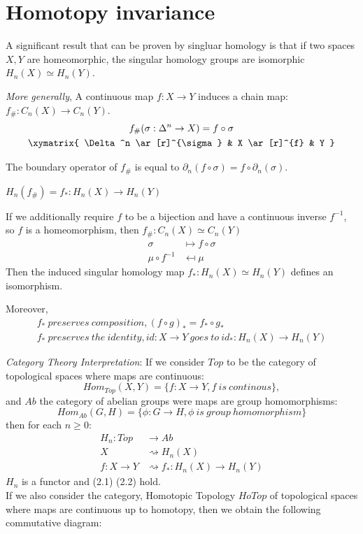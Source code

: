 \documentclass[11pt,a4paper]{report}
\begin{document}
    \section{Homotopy invariance}

    A significant result that can be proven by singluar homology is that if two spaces $X, Y$ are homeomorphic, the singular homology groups are isomorphic $ H_n(X) \simeq H_n(Y)$.

    \emph{More generally},
    A continuous map $f: X \rightarrow Y$ induces a chain map: $f_\#: C_n(X) \rightarrow C_n(Y)$.
    \begin{gather*}
        f_\#(\sigma: \Delta^ n \rightarrow X) = f \circ \sigma \\
                    \xymatrix{
                        \Delta^n  \ar[r]^{\sigma} &
                        X  \ar[r]^{f} & Y  }
    \end{gather*}

    The boundary operator of $f_\#$ is equal to $\partial_n(f \circ \sigma) = f \circ \partial_n(\sigma)$.

    $H_n(f_\#) = f_*: H_n(X) \rightarrow H_n(Y)$ \\

    \par
    If we additionally require $f$ to be a bijection and have a continuous inverse $f^{-1}$, so $f$ is a homeomorphism, then $f_\#: C_n(X) \simeq C_n(Y)$
    \begin{align*}
        \sigma &\mapsto f \circ \sigma \\
        \mu \circ f^{-1} &\mapsfrom \mu
    \end{align*}
    Then the induced singular homology map $f_*: H_n(X) \simeq H_n(Y)$ defines an isomorphism.

    Moreover,
    \begin{gather}
        f_* \ preserves \ composition, (f \circ g)_* = f_* \circ g_* \\
        f_* \ preserves \ the \ identity, id: X \rightarrow Y \ goes \ to \ id_*:  H_n(X) \rightarrow H_n(Y)
    \end{gather}

    \emph{Category Theory Interpretation}: \label{functoriality} If we consider $Top$ to be the category of topological spaces where maps are continuous:
    \[{Hom}_{Top}(X, Y) = \{f: X \rightarrow Y, f \ is \ continous\},\] and $Ab$ the category of abelian groups were maps are group homomorphisms: \[{Hom}_{Ab}(G, H) = \{\phi: G \rightarrow H, \phi \ is \ group \ homomorphism\}\] then for each $n \geq 0$:
     \begin{align*}
        H_n: Top &\rightarrow Ab \\
            X &\rightsquigarrow H_n(X) \\
        f: X \rightarrow Y &\rightsquigarrow f_*:  H_n(X) \rightarrow H_n(Y)
    \end{align*}
    $H_n$ is a functor and (2.1) (2.2) hold.  \\
    If we also consider the category, Homotopic Topology $HoTop$ of topological spaces where maps are continuous up to homotopy, then we obtain the following commutative diagram:
\end{document}

